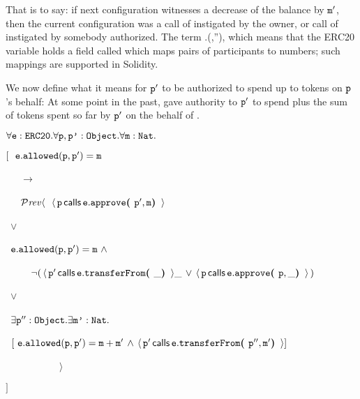\noindent
That is to say: if next configuration witnesses a decrease of the balance by
 $\prg{m}'$, then the current configuration was a call of  instigated by
 the owner, or  call of  instigated by somebody authorized.
The term .(,''), which means that the
ERC20 variable  holds a field called    which maps pairs of participants to numbers; such
mappings are supported in Solidity\cite{Solidity}.
 
We now define what it means for $\prg{p}'$ to be authorized  to  spend 
up to  tokens on  $\prg{p}$'s behalf: At some point in the
past,   gave authority to $\prg{p}'$  to spend   
plus the sum of  tokens
spent so far by $\prg{p}' $ on the behalf of . 

 
\vspace{.15cm}
\noindent
 $\forall \prg{e}:\prg{ERC20}.\forall \prg{p},\prg{p'}:\prg{Object}.\forall \prg{m}:\prg{Nat}.$\\
\strut \hspace{0.3cm} $[\ \ \prg{e}.\prg{allowed}(\prg{p},\prg{p}')=\prg{m} $\\
\strut \hspace{0.4cm} \ \ \ $\longrightarrow$\\
\strut \hspace{0.4cm} \ \ \  
     $\PrevId\langle\ \  \Calls{\prg{p}}  {\prg{approve}}  {\prg{e}} {\prg{p}',\prg{m}} $\\
      \strut \hspace{1.7cm} \ $\vee $\\
\strut \hspace{1.7cm} \  
     $    \prg{e}.\prg{allowed}(\prg{p},\prg{p}')=\prg{m}   
        \  \wedge\ $\\
\strut \hspace{1.5cm} \ \ \ \ \          
$  \neg   (\, {\Calls{\prg{p}'} {\prg{transferFrom}} {\prg{e}} {\_} {\_} } \, \vee \, {\Calls{\prg{p}} {\prg{approve}} {\prg{e}} {\prg{p},\_} } \, ) $\\
      \strut \hspace{1.7cm}\  $\vee $\\
\strut \hspace{1.7cm}   \  $ \exists \prg{p}'':\prg{Object}.\exists\prg{m'}:\prg{Nat}.$\\
 \strut \hspace{1.7cm}\  $[\   
  \prg{e}.\prg{allowed}(\prg{p},\prg{p}')=\prg{m}+\prg{m}'  \, \wedge\,   {\Calls{\prg{p}'} {\prg{transferFrom}} {\prg{e}} {\prg{p}'',\prg{m}'}  }   ]$\\
\strut \hspace{0.4cm} \ \ \  \ \ \  \ \ \ \ \ $\rangle $\\
\strut \hspace{0.3cm} $]$
\vspace{.15cm}
 

